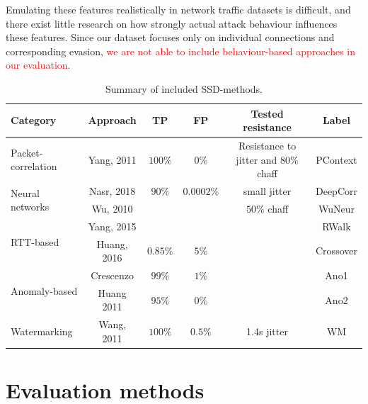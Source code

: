 \documentclass[runningheads]{llncs}\usepackage[]{graphicx}\usepackage[]{color}
\begin{document}
Emulating these features realistically in network traffic datasets is difficult, and there exist little research on how strongly actual attack behaviour influences these features. Since our dataset focuses only on individual connections and corresponding evasion, \textcolor{red}{we are not able to include behaviour-based approaches in our evaluation}.


\begin{table}
\centering
\begin{tabular}{l|c|c|c|c|c}
Category & Approach & TP & FP & Tested resistance & Label\\ \hline

Packet-correlation & Yang, 2011 \cite{yang2011correlating} & $100\%$ & $0\%$& \makecell{Resistance to jitter \\and $80\%$ chaff} & PContext\\ \hline

\multirow{2}{*}{Neural networks} & Nasr, 2018 \cite{nasr2018deepcorr} &$90\%$ & $0.0002\%$& small jitter & DeepCorr\\ \cline{2-6}

 & Wu, 2010 \cite{wu2010neural} &  & & $50\%$ chaff & WuNeur\\ \hline
 
\multirow{2}{*}{RTT-based} & Yang, 2015 \cite{yang2015rtt}&  & & &RWalk\\ \cline{2-6}

& Huang, 2016 \cite{huang2016detecting} & $0.85\%$ & $5\%$ & & Crossover\\ \hline
 
\multirow{2}{*}{Anomaly-based} & Crescenzo \cite{di2011detecting} & $99\%$ & $1\%$ & &Ano1\\ \cline{2-6}

& Huang 2011 \cite{huang2011detecting,ding2013detecting} & $95\%$ & $0\%$ & &Ano2\\ \hline

Watermarking & Wang, 2011 \cite{wang2010robust} & $100\%$ & $0.5\%$ & 1.4s jitter & WM\\ \hline
\end{tabular}
\caption{Summary of included SSD-methods.}\label{Tab:Summary}
\end{table}



\section{Evaluation methods}
\end{document}
